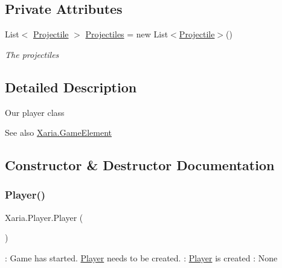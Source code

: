 \subsection*{Private Attributes}
\begin{DoxyCompactItemize}
\item 
List$<$ \hyperlink{classXaria_1_1Projectile}{Projectile} $>$ \hyperlink{classXaria_1_1Player_a643c5dbda599d86c01bde3cfd1749ae6}{Projectiles} = new List$<$\hyperlink{classXaria_1_1Projectile}{Projectile}$>$()
\begin{DoxyCompactList}\small\item\em The projectiles \end{DoxyCompactList}\end{DoxyCompactItemize}


\subsection{Detailed Description}
Our player class 

\begin{DoxySeeAlso}{See also}
\hyperlink{classXaria_1_1GameElement}{Xaria.\+Game\+Element}


\end{DoxySeeAlso}


\subsection{Constructor \& Destructor Documentation}
\mbox{\label{classXaria_1_1Player_a86d80bfee5af015e8612cd992bf53ad0}} 
\subsubsection{\texorpdfstring{Player()}{Player()}}
{\footnotesize\ttfamily Xaria.\+Player.\+Player (\begin{DoxyParamCaption}{ }\end{DoxyParamCaption})\hspace{0.3cm}{\ttfamily [inline]}}



\+: Game has started. \hyperlink{classXaria_1_1Player}{Player} needs to be created. \+: \hyperlink{classXaria_1_1Player}{Player} is created \+: None 



